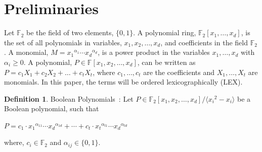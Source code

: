 \documentclass{article}
\date{}
\theoremstyle{definition}
\newtheorem{definition}{Definition}[section]
\begin{document}
\section{Preliminaries}
Let $\mathbb{F}_2$ be the field of two elements, $\{0,1\}$. A polynomial ring, $\mathbb{F}_2[x_1,\dots,x_d]$, is the set of all polynomials in variables, $x_1,x_2,\dots,x_d$, and coefficients in the field $\mathbb{F}_2$. A monomial, $M = {x_1}^{\alpha_1}\cdots \allowbreak {x_d}^{\alpha_d}$, is a power product in the variables $x_1,\dots,x_d$ with $\alpha_i \geq 0$. A polynomial, $P \in \mathbb{F}[x_1,x_2,\dots,x_d]$, can be written as $P = c_1X_1 + c_2X_2 + \dots + c_tX_t$, where $c_1,\dots, c_t$ are the coefficients and $X_1, \dots, X_t$ are monomials. In this paper, the terms will be ordered lexicographically (LEX). 
\theoremstyle{definition}
\begin{definition}{{Boolean Polynomials~\cite{polybori}:}}
Let $P \in \mathbb{F}_2[x_1,x_2,\dots,x_d]/\langle {x_i}^2 - x_i\rangle$ be a Boolean polynomial, such that
\begin{center}
$P = c_1\cdot {x_1}^{\alpha_{11}}\cdots {x_d}^{\alpha_{1d}} + \cdots + c_t\cdot {x_t}^{\alpha_{t1}}\cdots {x_d}^{\alpha_{td}}$
\end{center} 
where, $c_i \in \mathbb{F}_2$ and $\alpha_{ij} \in \{0,1\}$.
\end{definition}
 
\end{document}
